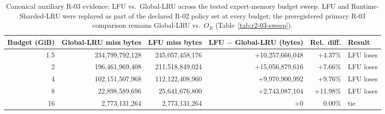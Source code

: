 \begin{table}[t]
\centering
\caption{Canonical auxiliary R-03 evidence: LFU vs.\ Global-LRU across the tested expert-memory budget sweep. LFU and Runtime-Sharded-LRU were replayed as part of the declared R-02 policy set at every budget; the preregistered primary R-03 comparison remains Global-LRU vs.\ $O_B$ (Table~\ref{tab:r2-03-sweep}).}
\label{tab:r2-03-lfu-aux}
\footnotesize
\setlength{\tabcolsep}{4pt}
\begin{tabular}{@{}rrrrrl@{}}
\toprule
Budget (GiB) & Global-LRU miss bytes & LFU miss bytes & LFU $-$ Global-LRU (bytes) & Rel.\ diff. & Result \\
\midrule
1.5 & 234,799,792,128 & 245,057,458,176 & +10,257,666,048 & +4.37\% & LFU loses \\
2 & 196,461,969,408 & 211,518,849,024 & +15,056,879,616 & +7.66\% & LFU loses \\
4 & 102,151,507,968 & 112,122,408,960 & +9,970,900,992 & +9.76\% & LFU loses \\
8 & 22,898,589,696 & 25,641,676,800 & +2,743,087,104 & +11.98\% & LFU loses \\
16 & 2,773,131,264 & 2,773,131,264 & +0 & 0.00\% & tie \\
\bottomrule
\end{tabular}
\end{table}
